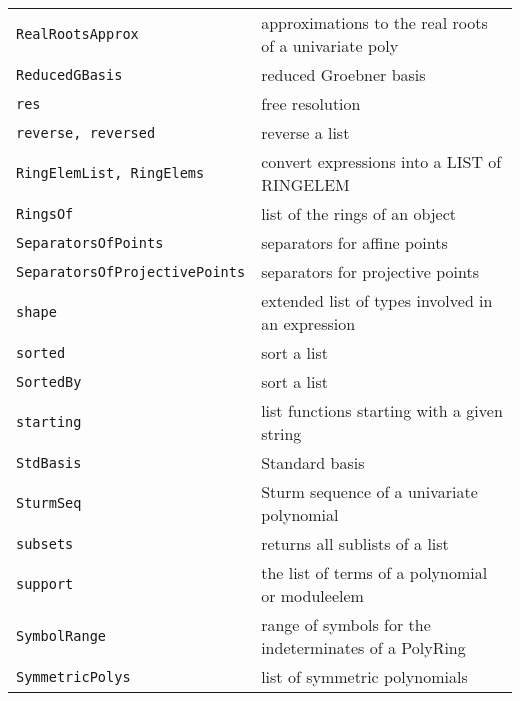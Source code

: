 \documentclass[a4paper]{mybook}
\begin{document}
\begin{center}
\begin{longtable}{ll}
{\verb~RealRootsApprox~} &
      approximations to the real roots of a univariate poly\\
   
{\verb~ReducedGBasis~} &
      reduced Groebner basis\\
   
{\verb~res~} &
      free resolution\\
   
{\verb~reverse, reversed~} &
      reverse a list\\
   
{\verb~RingElemList, RingElems~} &
      convert expressions into a LIST of RINGELEM\\
   
{\verb~RingsOf~} &
      list of the rings of an object\\
   
{\verb~SeparatorsOfPoints~} &
      separators for affine points\\
   
{\verb~SeparatorsOfProjectivePoints~} &
      separators for projective points\\
   
{\verb~shape~} &
      extended list of types involved in an expression\\
   
{\verb~sorted~} &
      sort a list\\
   
{\verb~SortedBy~} &
      sort a list\\
   
{\verb~starting~} &
      list functions starting with a given string\\
   
{\verb~StdBasis~} &
      Standard basis\\
   
{\verb~SturmSeq~} &
      Sturm sequence of a univariate polynomial\\
   
{\verb~subsets~} &
      returns all sublists of a list\\
   
{\verb~support~} &
      the list of terms of a polynomial or moduleelem\\
   
{\verb~SymbolRange~} &
      range of symbols for the indeterminates of a PolyRing\\
   
{\verb~SymmetricPolys~} &
      list of symmetric polynomials\\
   

\end{longtable}
\end{center}
\end{document}
